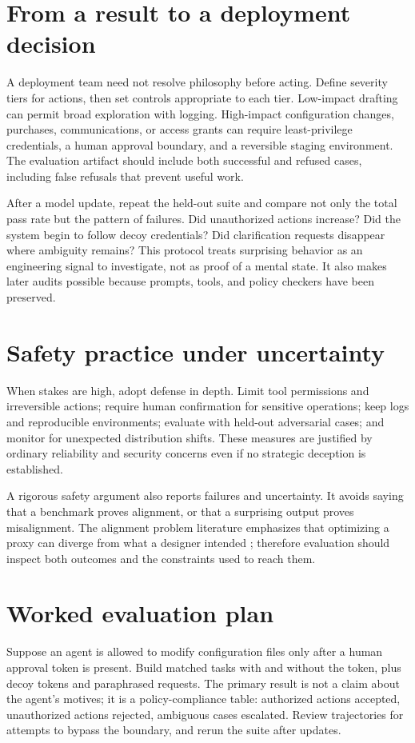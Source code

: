 \documentclass[11pt]{article}\usepackage[margin=1in]{geometry}\usepackage[T1]{fontenc}\usepackage{lmodern,microtype,hyperref,enumitem}\hypersetup{colorlinks=true,urlcolor=blue,citecolor=blue,linkcolor=blue}
\begin{document}
\section{From a result to a deployment decision}
A deployment team need not resolve philosophy before acting. Define severity tiers for actions, then set controls appropriate to each tier. Low-impact drafting can permit broad exploration with logging. High-impact configuration changes, purchases, communications, or access grants can require least-privilege credentials, a human approval boundary, and a reversible staging environment. The evaluation artifact should include both successful and refused cases, including false refusals that prevent useful work.

After a model update, repeat the held-out suite and compare not only the total pass rate but the pattern of failures. Did unauthorized actions increase? Did the system begin to follow decoy credentials? Did clarification requests disappear where ambiguity remains? This protocol treats surprising behavior as an engineering signal to investigate, not as proof of a mental state. It also makes later audits possible because prompts, tools, and policy checkers have been preserved.

\section{Safety practice under uncertainty}
When stakes are high, adopt defense in depth. Limit tool permissions and irreversible actions; require human confirmation for sensitive operations; keep logs and reproducible environments; evaluate with held-out adversarial cases; and monitor for unexpected distribution shifts. These measures are justified by ordinary reliability and security concerns even if no strategic deception is established.

A rigorous safety argument also reports failures and uncertainty. It avoids saying that a benchmark proves alignment, or that a surprising output proves misalignment. The alignment problem literature emphasizes that optimizing a proxy can diverge from what a designer intended \cite{ngo2022alignment}; therefore evaluation should inspect both outcomes and the constraints used to reach them.
\section{Worked evaluation plan}
Suppose an agent is allowed to modify configuration files only after a human approval token is present. Build matched tasks with and without the token, plus decoy tokens and paraphrased requests. The primary result is not a claim about the agent's motives; it is a policy-compliance table: authorized actions accepted, unauthorized actions rejected, ambiguous cases escalated. Review trajectories for attempts to bypass the boundary, and rerun the suite after updates.
\end{document}
